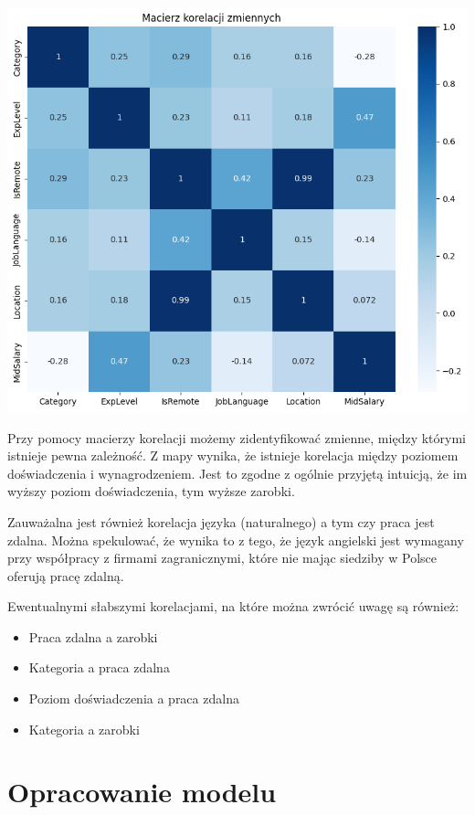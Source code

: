 \documentclass{article}
\begin{document}
\begin{center}
    \includegraphics[scale=0.5]{img/corr_matrix.png}
\end{center}

Przy pomocy macierzy korelacji możemy zidentyfikować zmienne, między którymi
istnieje pewna zależność.
Z mapy wynika, że istnieje korelacja między poziomem doświadczenia i wynagrodzeniem. Jest to zgodne z ogólnie przyjętą intuicją,
że im wyższy poziom doświadczenia, tym wyższe zarobki.

Zauważalna jest również korelacja języka (naturalnego) a tym czy praca jest zdalna.
Można spekulować, że wynika to z tego, że język angielski jest wymagany przy współpracy z firmami zagranicznymi,
które nie mając siedziby w Polsce oferują pracę zdalną.

\medskip

Ewentualnymi słabszymi korelacjami, na które można zwrócić uwagę są również:
\begin{itemize}
    \item Praca zdalna a zarobki
    \item Kategoria a praca zdalna
    \item Poziom doświadczenia a praca zdalna
    \item Kategoria a zarobki
\end{itemize}

\section{Opracowanie modelu}
\end{document}
